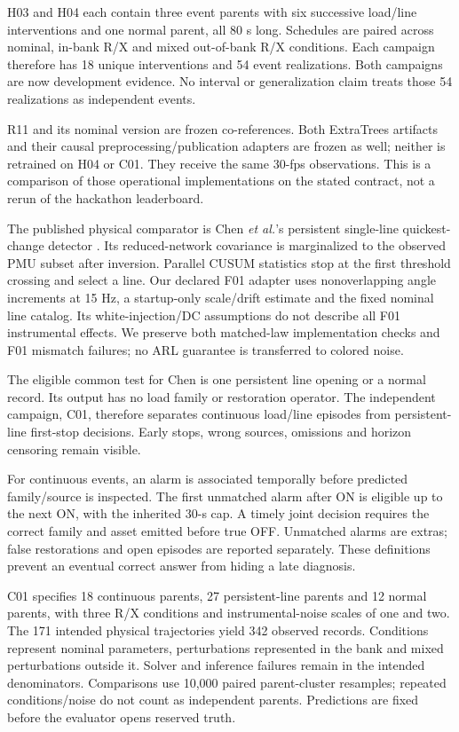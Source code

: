 H03 and H04 each contain three event parents with six successive load/line interventions and one normal parent, all 80 s long. Schedules are paired across nominal, in-bank R/X and mixed out-of-bank R/X conditions. Each campaign therefore has 18 unique interventions and 54 event realizations. Both campaigns are now development evidence. No interval or generalization claim treats those 54 realizations as independent events.

R11 and its nominal version are frozen co-references. Both ExtraTrees artifacts and their causal preprocessing/publication adapters are frozen as well; neither is retrained on H04 or C01. They receive the same 30-fps observations. This is a comparison of those operational implementations on the stated contract, not a rerun of the hackathon leaderboard.

The published physical comparator is Chen \emph{et al.}'s persistent single-line quickest-change detector \cite{chen2016quickest}. Its reduced-network covariance is marginalized to the observed PMU subset after inversion. Parallel CUSUM statistics stop at the first threshold crossing and select a line. Our declared F01 adapter uses nonoverlapping angle increments at 15 Hz, a startup-only scale/drift estimate and the fixed nominal line catalog. Its white-injection/DC assumptions do not describe all F01 instrumental effects. We preserve both matched-law implementation checks and F01 mismatch failures; no ARL guarantee is transferred to colored noise.

The eligible common test for Chen is one persistent line opening or a normal record. Its output has no load family or restoration operator. The independent campaign, C01, therefore separates continuous load/line episodes from persistent-line first-stop decisions. Early stops, wrong sources, omissions and horizon censoring remain visible.

For continuous events, an alarm is associated temporally before predicted family/source is inspected. The first unmatched alarm after ON is eligible up to the next ON, with the inherited 30-s cap. A timely joint decision requires the correct family and asset emitted before true OFF. Unmatched alarms are extras; false restorations and open episodes are reported separately. These definitions prevent an eventual correct answer from hiding a late diagnosis.

C01 specifies 18 continuous parents, 27 persistent-line parents and 12 normal parents, with three R/X conditions and instrumental-noise scales of one and two. The 171 intended physical trajectories yield 342 observed records. Conditions represent nominal parameters, perturbations represented in the bank and mixed perturbations outside it. Solver and inference failures remain in the intended denominators. Comparisons use 10,000 paired parent-cluster resamples; repeated conditions/noise do not count as independent parents. Predictions are fixed before the evaluator opens reserved truth.

